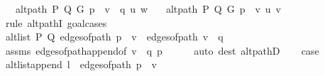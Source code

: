 \begin{isabellebody}
\ \ \ {\isachardoublequoteopen}alt{\isacharunderscore}{\kern0pt}path\ P\ Q\ G\ {\isacharparenleft}{\kern0pt}p\ {\isacharat}{\kern0pt}\ v\ {\isacharhash}{\kern0pt}\ q{\isacharparenright}{\kern0pt}\ u\ w{\isachardoublequoteclose}\isanewline
\ \ \ {\isachardoublequoteopen}alt{\isacharunderscore}{\kern0pt}path\ P\ Q\ G\ {\isacharparenleft}{\kern0pt}p\ {\isacharat}{\kern0pt}\ {\isacharbrackleft}{\kern0pt}v{\isacharbrackright}{\kern0pt}{\isacharparenright}{\kern0pt}\ u\ v{\isachardoublequoteclose}\isanewline
%
\isadelimproof
%
\endisadelimproof
%
\isatagproof
{}\isamarkupfalse%
\ {\isacharparenleft}{\kern0pt}rule\ alt{\isacharunderscore}{\kern0pt}pathI{\isacharcomma}{\kern0pt}\ goal{\isacharunderscore}{\kern0pt}cases{\isacharparenright}{\kern0pt}\isanewline
\ \ \isamarkupfalse%
\ {}\isanewline
\ \ \isamarkupfalse%
\ {\isachardoublequoteopen}alt{\isacharunderscore}{\kern0pt}list\ P\ Q\ {\isacharparenleft}{\kern0pt}edges{\isacharunderscore}{\kern0pt}of{\isacharunderscore}{\kern0pt}path\ {\isacharparenleft}{\kern0pt}p\ {\isacharat}{\kern0pt}\ {\isacharbrackleft}{\kern0pt}v{\isacharbrackright}{\kern0pt}{\isacharparenright}{\kern0pt}\ {\isacharat}{\kern0pt}\ edges{\isacharunderscore}{\kern0pt}of{\isacharunderscore}{\kern0pt}path\ {\isacharparenleft}{\kern0pt}v\ {\isacharhash}{\kern0pt}\ q{\isacharparenright}{\kern0pt}{\isacharparenright}{\kern0pt}{\isachardoublequoteclose}\isanewline
\ \ \ \ \isamarkupfalse%
\ assms\ edges{\isacharunderscore}{\kern0pt}of{\isacharunderscore}{\kern0pt}path{\isacharunderscore}{\kern0pt}append{\isacharunderscore}{\kern0pt}{}{\isacharbrackleft}{\kern0pt}of\ {\isachardoublequoteopen}v\ {\isacharhash}{\kern0pt}\ q{\isachardoublequoteclose}\ p{\isacharbrackright}{\kern0pt}\isanewline
\ \ \ \ \isamarkupfalse%
\ {\isacharparenleft}{\kern0pt}auto\ dest{\isacharcolon}{\kern0pt}\ alt{\isacharunderscore}{\kern0pt}pathD{\isacharparenleft}{\kern0pt}{}{\isacharparenright}{\kern0pt}{\isacharparenright}{\kern0pt}\isanewline
\ \ \isamarkupfalse%
\ {\isacharquery}{\kern0pt}case\isanewline
\ \ \ \ \isamarkupfalse%
\ alt{\isacharunderscore}{\kern0pt}list{\isacharunderscore}{\kern0pt}append{\isacharunderscore}{\kern0pt}{}{\isacharbrackleft}{\kern0pt}\ {\isacharquery}{\kern0pt}l{}{\isachardot}{\kern0pt}{}\ {\isacharequal}{\kern0pt}\ {\isachardoublequoteopen}edges{\isacharunderscore}{\kern0pt}of{\isacharunderscore}{\kern0pt}path\ {\isacharparenleft}{\kern0pt}p\ {\isacharat}{\kern0pt}\ {\isacharbrackleft}{\kern0pt}v{\isacharbrackright}{\kern0pt}{\isacharparenright}{\kern0pt}{\isachardoublequoteclose}{\isacharbrackright}{\kern0pt}\isanewline

\end{isabellebody}
